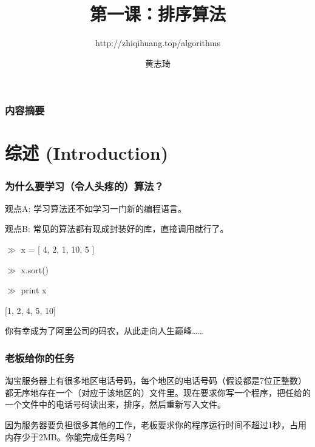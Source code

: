 \documentclass[CJK,14pt]{beamer}
\begin{document}
\bch

\title{第一课：排序算法}
\subtitle{http://zhiqihuang.top/algorithms}
  \author{黄志琦}
  \date{}

  \maketitle

  \begin{frame}
    \frametitle{内容摘要}
  \tableofcontents
  \end{frame}

  \section{综述 (Introduction)}

  \begin{frame}
\frametitle{为什么要学习（令人头疼的）算法？}


    
  \end{frame}

  
  \begin{frame}
    \bitem
  \item{观点A: 学习算法还不如学习一门新的编程语言。}
    \eitem

  \end{frame}
  
  
  \begin{frame}
    \bitem
  \item{观点B: 常见的算法都有现成封装好的库，直接调用就行了。}
    \eitem

{\color{violet}
    $\gg$ x = [ 4, 2, 1, 10, 5 ]
    
    $\gg$ x.sort()
    
    $\gg$  print x

  [1, 2, 4, 5, 10]
}

    
  \end{frame}


  \begin{frame}
    你有幸成为了阿里公司的码农，从此走向人生巅峰……

  \end{frame}

  \begin{frame}
\frametitle{老板给你的任务}
    淘宝服务器上有很多地区电话号码，每个地区的电话号码（假设都是7位正整数）都无序地存在一个（对应于该地区的）文件里。现在要求你写一个程序，把任给的一个文件中的电话号码读出来，排序，然后重新写入文件。

    因为服务器要负担很多其他的工作，老板要求你的程序运行时间不超过1秒，占用内存少于2MB。你能完成任务吗？
    
  \end{frame}
\end{document}
